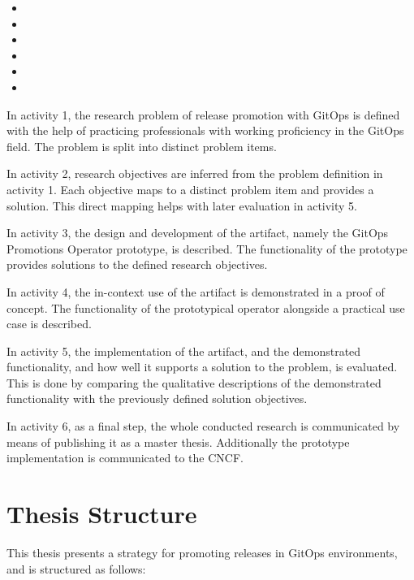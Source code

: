 \begin{itemize}
	\item {}
	\item {}
	\item {}
	\item {}
	\item {}
	\item {}
\end{itemize}

In activity 1,
the research problem of
release promotion with GitOps
is defined
with the help of practicing professionals with working proficiency in the GitOps field.
The problem is split into distinct problem items.

In activity 2,
research objectives are inferred from the problem definition in activity 1.
Each objective maps to a distinct problem item
and provides a solution.
This direct mapping helps with later evaluation in activity 5.

In activity 3,
the design and development of the artifact,
namely the GitOps Promotions Operator prototype,
is described.
The functionality of the prototype provides solutions
to the defined research objectives.

In activity 4,
the in-context use of the artifact is demonstrated in a proof of concept.
The functionality of the prototypical operator alongside a practical use case is described.

In activity 5,
the implementation of the artifact,
and the demonstrated functionality,
and how well it supports a solution to the problem,
is evaluated.
This is done by comparing the qualitative descriptions of the demonstrated functionality
with the previously defined solution objectives.

In activity 6, as a final step,
the whole conducted research is communicated by means of
publishing it as a master thesis.
Additionally the prototype implementation is communicated to the CNCF.


\vfill

\section{Thesis Structure}
\label{introduction:thesis-structure}

This thesis presents a strategy for promoting releases in GitOps environments,
and is structured as follows:

